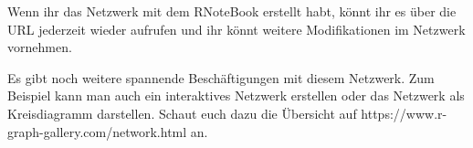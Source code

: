 \documentclass[11pt]{article}
\begin{document}
Wenn ihr das Netzwerk mit dem RNoteBook erstellt habt, könnt ihr es über
die URL jederzeit wieder aufrufen und ihr könnt weitere Modifikationen
im Netzwerk vornehmen.

Es gibt noch weitere spannende Beschäftigungen mit diesem Netzwerk. Zum
Beispiel kann man auch ein interaktives Netzwerk erstellen oder das
Netzwerk als Kreisdiagramm darstellen. Schaut euch dazu die Übersicht
auf https://www.r-graph-gallery.com/network.html an.

    \begin{tcolorbox}[breakable, size=fbox, boxrule=1pt, pad at break*=1mm,colback=cellbackground, colframe=cellborder]
\begin{Verbatim}[commandchars=\\\{\}]

\end{Verbatim}
\end{tcolorbox}


    
    
    
\end{document}
